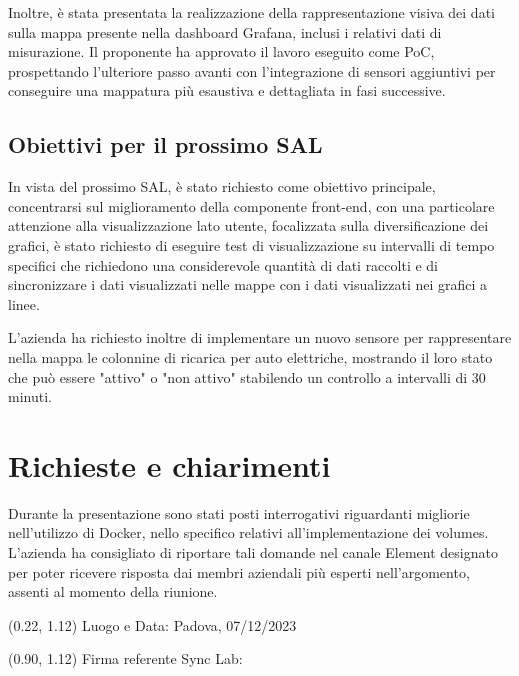 \documentclass{article}
\begin{document}
    Inoltre, è stata presentata la realizzazione della rappresentazione visiva dei dati sulla mappa presente nella dashboard Grafana, inclusi i relativi dati di misurazione. Il proponente ha approvato il lavoro eseguito come PoC, prospettando l'ulteriore passo avanti con l'integrazione di sensori aggiuntivi per conseguire una mappatura più esaustiva e dettagliata in fasi successive.

    \subsection{Obiettivi per il prossimo SAL}
    In vista del prossimo SAL, è stato richiesto come obiettivo principale, concentrarsi sul miglioramento della componente front-end, con una particolare attenzione alla visualizzazione lato utente, focalizzata sulla diversificazione dei grafici, è stato richiesto di eseguire test di visualizzazione su intervalli di tempo specifici che richiedono una considerevole quantità di dati raccolti e di sincronizzare i dati visualizzati nelle mappe con i dati visualizzati nei grafici a linee.
    
    L'azienda ha richiesto inoltre di implementare un nuovo sensore per rappresentare nella mappa le colonnine di ricarica per auto elettriche, mostrando il loro stato che può essere "attivo" o "non attivo" stabilendo un controllo a intervalli di 30 minuti.

\section{Richieste e chiarimenti}
Durante la presentazione sono stati posti interrogativi riguardanti migliorie nell'utilizzo di Docker, nello specifico relativi all'implementazione dei volumes. L'azienda ha consigliato di riportare tali domande nel canale Element designato per poter ricevere risposta dai membri aziendali più esperti nell'argomento, assenti al momento della riunione.

\begin{textblock*}{\textwidth}(0.22\textwidth, 1.12\textheight)
    Luogo e Data: Padova, 07/12/2023
\end{textblock*}

\begin{textblock*}{\textwidth}(0.90\textwidth, 1.12\textheight)
        Firma referente Sync Lab:
\end{textblock*}
\end{document}
